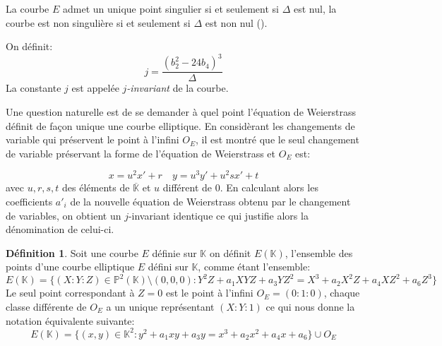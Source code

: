 \documentclass[10pt,a4paper]{book}
\theoremstyle{plain}
\theoremstyle{definition}
\theoremstyle{definition}
\theoremstyle{definition}
\theoremstyle{definition}
\newtheorem{defi}[thm]{Définition}
\theoremstyle{remark}
\theoremstyle{remark}
\begin{document}
La courbe $E$ admet un unique point singulier si et seulement si $\Delta$ est nul, la courbe est non singulière si et seulement si $\Delta$ est non nul (\cite[Prop. III.1.4]{Silv1}).



On définit: 
\begin{equation*}
j=\frac{(b_2^2-24b_4)^3}{\Delta}
\end{equation*}
La constante $j$ est appelée \emph{$j$-invariant} de la courbe.

Une question naturelle est de se demander à quel point l'équation de Weierstrass définit de façon unique une courbe elliptique. En considèrant les changements de variable qui préservent le point à l'infini $O_E$, il est montré \cite[III.3.1b]{Silv1} que le seul changement de variable préservant la forme de l'équation de Weierstrass et $O_E$ est:

\begin{equation*}
x=u^2x'+r    \quad  y=u^3y'+u^2sx'+t
\end{equation*}
avec $u,r,s,t$ des éléments de $\overline{\mathbb{K}}$ et $u$ différent de $0$. En calculant alors les coefficients $a'_i$ de la nouvelle équation de Weierstrass obtenu par le changement de variables, on obtient un $j$-invariant identique ce qui justifie alors la dénomination de celui-ci.
\newline


\begin{defi}
Soit une courbe $E$ définie sur $\mathbb{K}$ on définit $E(\mathbb{K})$, l'ensemble des points d'une courbe elliptique $E$ défini sur $\mathbb{K}$, comme étant l'ensemble:
\begin{equation*}
E(\mathbb{K})=\{(X:Y:Z)\in \mathbb{P}^2(\mathbb{K}) \setminus (0,0,0) : Y^2Z+a_1XYZ+a_3YZ^2=X^3+a_2X^2Z+a_4XZ^2+a_6Z^3 \}
\end{equation*}
Le seul point correspondant à $Z=0$ est le point à l'infini $O_E=(0:1:0)$, chaque classe différente de $O_E$ a un unique représentant $(X:Y:1)$ ce qui nous donne la notation équivalente suivante:
\begin{equation*}
E(\mathbb{K})=\{(x,y)\in \mathbb{K}^2  : y^2+a_1xy+a_3y=x^3+a_2x^2+a_4x+a_6 \} \cup {O_E}
\end{equation*}
\end{defi}
\end{document}
